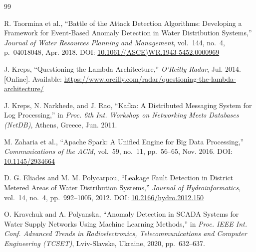 \documentclass[12pt, a4paper]{article}
\begin{document}
\tableofcontents
\clearpage

\listoffigures
{}
\clearpage

\listoftables
{}
\clearpage
% 

\clearpage
\newpage
% 

\clearpage
\newpage
% 

\clearpage
\newpage
% 

\clearpage
\newpage
% 

\clearpage
\newpage

\clearpage
\newpage

\clearpage
\newpage
\begin{thebibliography}{99}

R. Taormina et al.,
``Battle of the Attack Detection Algorithms: Developing a Framework for
Event-Based Anomaly Detection in Water Distribution Systems,''
\emph{Journal of Water Resources Planning and Management},
vol.~144, no.~4, p.~04018048, Apr. 2018.
\newblock DOI: \href{https://doi.org/10.1061/(ASCE)WR.1943-5452.0000969}{10.1061/(ASCE)WR.1943-5452.0000969}

J. Kreps,
``Questioning the Lambda Architecture,''
\emph{O'Reilly Radar}, Jul. 2014.
[Online]. Available:
\url{https://www.oreilly.com/radar/questioning-the-lambda-architecture/}

J. Kreps, N. Narkhede, and J. Rao,
``Kafka: A Distributed Messaging System for Log Processing,''
in \emph{Proc. 6th Int. Workshop on Networking Meets Databases (NetDB)},
Athens, Greece, Jun. 2011.

M. Zaharia et al.,
``Apache Spark: A Unified Engine for Big Data Processing,''
\emph{Communications of the ACM}, vol.~59, no.~11, pp.~56--65, Nov. 2016.
\newblock DOI: \href{https://doi.org/10.1145/2934664}{10.1145/2934664}

D. G. Eliades and M. M. Polycarpou,
``Leakage Fault Detection in District Metered Areas of Water Distribution
Systems,''
\emph{Journal of Hydroinformatics}, vol.~14, no.~4, pp.~992--1005, 2012.
\newblock DOI: \href{https://doi.org/10.2166/hydro.2012.150}{10.2166/hydro.2012.150}

O. Kravchuk and A. Polyanska,
``Anomaly Detection in SCADA Systems for Water Supply Networks Using
Machine Learning Methods,''
in \emph{Proc. IEEE Int. Conf. Advanced Trends in Radioelectronics,
Telecommunications and Computer Engineering (TCSET)},
Lviv-Slavske, Ukraine, 2020, pp.~632--637.


\end{thebibliography}
\end{document}
